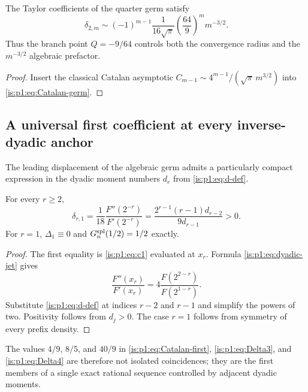 \begin{proposition}
\label{is:p1:prop:Catalan-large-order}
The Taylor coefficients of the quarter germ satisfy
\begin{equation}
 \boxed{
 \delta_{2,m}\sim
 (-1)^{m-1}\frac1{16\sqrt\pi}\left(\frac{64}{9}\right)^m m^{-3/2}.}
 \label{is:p1:eq:Catalan-large-order}
\end{equation}
Thus the branch point $Q=-9/64$ controls both the convergence radius and the
$m^{-3/2}$ algebraic prefactor.
\end{proposition}

\begin{proof}
Insert the classical Catalan asymptotic
$C_{m-1}\sim4^{m-1}/(\sqrt\pi\,m^{3/2})$ into
\eqref{is:p1:eq:Catalan-germ}.
\end{proof}

\subsection{A universal first coefficient at every inverse-dyadic anchor}

The leading displacement of the algebraic germ admits a particularly compact expression in
the dyadic moment numbers $d_r$ from \eqref{is:p1:eq:d-def}.

\begin{proposition}
\label{is:p1:prop:first-dyadic-germ-coefficient}
For every $r\ge2$,
\begin{equation}
 \boxed{
 \delta_{r,1}
 =\frac1{18}\frac{F''(2^{-r})}{F'(2^{-r})}
 =\frac{2^{r-1}(r-1)d_{r-2}}{9d_{r-1}}>0.}
 \label{is:p1:eq:first-dyadic-germ-coefficient}
\end{equation}
For $r=1$, $\Delta_1\equiv0$ and $G_{n}^{\mathrm{spl}}(1/2)=1/2$ exactly.
\end{proposition}

\begin{proof}
The first equality is \eqref{is:p1:eq:c1} evaluated at $x_r$.  Formula
\eqref{is:p1:eq:dyadic-jet} gives
\[
 \frac{F''(x_r)}{F'(x_r)}
 =4\frac{F(2^{2-r})}{F(2^{1-r})}.
\]
Substitute \eqref{is:p1:eq:d-def} at indices $r-2$ and $r-1$ and simplify the powers
of two.  Positivity follows from $d_j>0$.  The case $r=1$ follows from symmetry
of every prefix density.
\end{proof}

The values $4/9$, $8/5$, and $40/9$ in
\eqref{is:p1:eq:Catalan-first}, \eqref{is:p1:eq:Delta3}, and \eqref{is:p1:eq:Delta4} are therefore
not isolated coincidences; they are the first members of a single exact rational
sequence controlled by adjacent dyadic moments.

